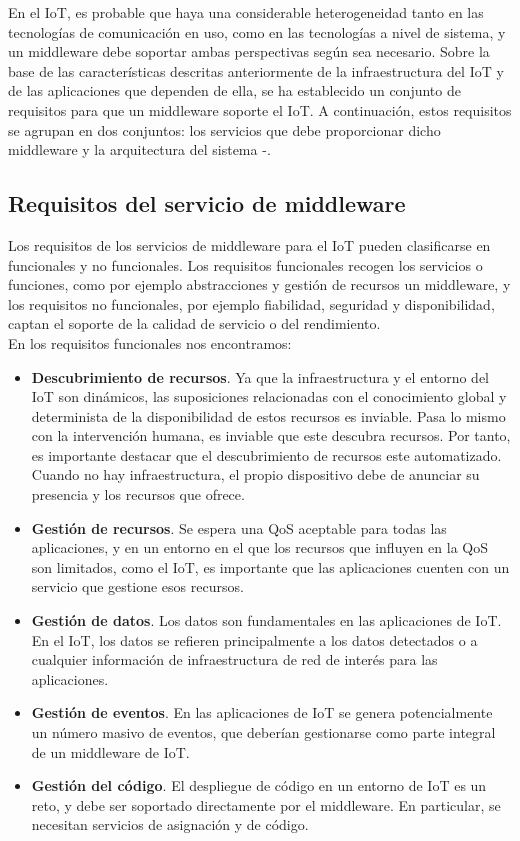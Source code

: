 {En el IoT, es probable que haya una considerable heterogeneidad tanto en las tecnologías de comunicación en uso, como en las tecnologías a nivel de sistema, y un middleware debe soportar ambas perspectivas según sea necesario. Sobre la base de las características descritas anteriormente de la infraestructura del IoT y de las aplicaciones que dependen de ella, se ha establecido un conjunto de requisitos para que un middleware soporte el IoT. A continuación, estos requisitos se agrupan en dos conjuntos: los servicios que debe proporcionar dicho middleware y la arquitectura del sistema \cite{7322178}-\cite{7582463}.

\subsection{Requisitos del servicio de middleware}

 Los requisitos de los servicios de middleware para el IoT pueden clasificarse en funcionales y no funcionales. Los requisitos funcionales recogen los servicios o funciones, como por ejemplo abstracciones y gestión de recursos un middleware, y los requisitos no funcionales, por ejemplo fiabilidad, seguridad y disponibilidad, captan el soporte de la calidad de servicio o del rendimiento.\\
 
 En los requisitos funcionales nos encontramos:
 
 \begin{itemize}
     \item \textbf{Descubrimiento de recursos}. Ya que la infraestructura y el entorno del IoT son dinámicos, las suposiciones relacionadas con el conocimiento global y determinista de la disponibilidad de estos recursos es inviable. Pasa lo mismo con la intervención humana, es inviable que este descubra recursos. Por tanto, es importante destacar que el descubrimiento de recursos este automatizado. Cuando no hay infraestructura, el propio dispositivo debe de anunciar su presencia y los recursos que ofrece.
     \item \textbf{Gestión de recursos}. Se espera una QoS aceptable para todas las aplicaciones, y en un entorno en el que los recursos que influyen en la QoS son limitados, como el IoT, es importante que las aplicaciones cuenten con un servicio que gestione esos recursos.
     \item \textbf{Gestión de datos}. Los datos son fundamentales en las aplicaciones de IoT. En el IoT, los datos se refieren principalmente a los datos detectados o a cualquier información de infraestructura de red de interés para las aplicaciones.
     \item \textbf{Gestión de eventos}. En las aplicaciones de IoT se genera potencialmente un número masivo de eventos, que deberían gestionarse como parte integral de un middleware de IoT.
     \item \textbf{Gestión del código}. El despliegue de código en un entorno de IoT es un reto, y debe ser soportado directamente por el middleware. En particular, se necesitan servicios de asignación y de código.
 \end{itemize}
 
}
